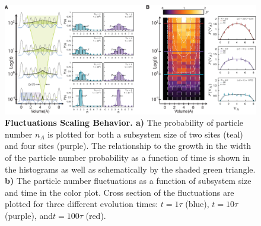 \begin{figure}[ht!]
		\includegraphics[width=\columnwidth]{figures/ch6/fig2v4_a.pdf} 
		\caption{\textbf{Fluctuations Scaling Behavior. a)}  The probability of particle number $n_A$ is plotted for both a subsystem size of two sites (teal) and four sites (purple). The relationship to the growth in the width of the particle number probability as a function of time is shown in the histograms as well as schematically by the shaded green triangle. \textbf{b)} The particle number fluctuations as a function of subsystem size and time in the color plot. Cross section of the fluctuations are plotted for three different evolution times: $t=1\tau$ (blue), $t=10\tau$ (purple), and$t=100\tau$ (red). }
		\label{fig:fScaling}	
\end{figure}

